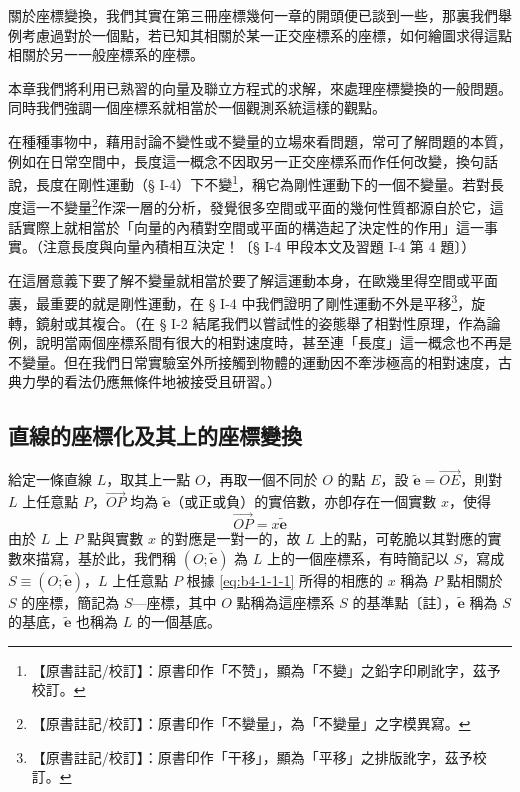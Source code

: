 關於座標變換，我們其實在第三冊座標幾何一章的開頭便已談到一些，那裏我們舉例考慮過對於一個點，若已知其相關於某一正交座標系的座標，如何繪圖求得這點相關於另一一般座標系的座標。

本章我們將利用已熟習的向量及聯立方程式的求解，來處理座標變換的一般問題。同時我們強調一個座標系就相當於一個觀測系統這樣的觀點。

在種種事物中，藉用討論不變性或不變量的立場來看問題，常可了解問題的本質，例如在日常空間中，長度這一概念不因取另一正交座標系而作任何改變，換句話說，長度在剛性運動（§ I-4）下不變\label{note:b4-ch1-p2-bubiang}\footnote{【原書註記/校訂】：原書印作「不赞」，顯為「不變」之鉛字印刷訛字，茲予校訂。}，稱它為剛性運動下的一個不變量。若對長度這一不變量\label{note:b4-ch1-p2-bubiangliang}\footnote{【原書註記/校訂】：原書印作「不孌量」，為「不變量」之字模異寫。}作深一層的分析，發覺很多空間或平面的幾何性質都源自於它，這話實際上就相當於「向量的內積對空間或平面的構造起了決定性的作用」這一事實。（注意長度與向量內積相互決定！〔§ I-4 甲段本文及習題 I-4 第 4 題〕）

在這層意義下要了解不變量就相當於要了解這運動本身，在歐幾里得空間或平面裏，最重要的就是剛性運動，在 § I-4 中我們證明了剛性運動不外是平移\label{note:b4-ch1-p2-pingyi}\footnote{【原書註記/校訂】：原書印作「干移」，顯為「平移」之排版訛字，茲予校訂。}，旋轉，鏡射或其複合。（在 § I-2 結尾我們以嘗試性的姿態舉了相對性原理，作為論例，說明當兩個座標系間有很大的相對速度時，甚至連「長度」這一概念也不再是不變量。但在我們日常實驗室外所接觸到物體的運動因不牽涉極高的相對速度，古典力學的看法仍應無條件地被接受且研習。）

\subsection{直線的座標化及其上的座標變換}
\label{sec:b4-1-1}

給定一條直線 $L$，取其上一點 $O$，再取一個不同於 $O$ 的點 $E$，設 $\tilde{\mathbf{e}} = \vec{OE}$，則對 $L$ 上任意點 $P$，$\vec{OP}$ 均為 $\tilde{\mathbf{e}}$（或正或負）的實倍數，亦卽存在一個實數 $x$，使得
\begin{equation}
\vec{OP} = x \tilde{\mathbf{e}} \label{eq:b4-1-1-1}
\end{equation}
由於 $L$ 上 $P$ 點與實數 $x$ 的對應是一對一的，故 $L$ 上的點，可乾脆以其對應的實數來描寫，基於此，我們稱 $(O; \tilde{\mathbf{e}})$ 為 $L$ 上的一個座標系，有時簡記以 $S$，寫成 $S \equiv (O; \tilde{\mathbf{e}})$，$L$ 上任意點 $P$ 根據 \eqref{eq:b4-1-1-1} 所得的相應的 $x$ 稱為 $P$ 點相關於 $S$ 的座標，簡記為 $S$---座標，其中 $O$ 點稱為這座標系 $S$ 的基準點〔註〕，$\tilde{\mathbf{e}}$ 稱為 $S$ 的基底，$\tilde{\mathbf{e}}$ 也稱為 $L$ 的一個基底。


